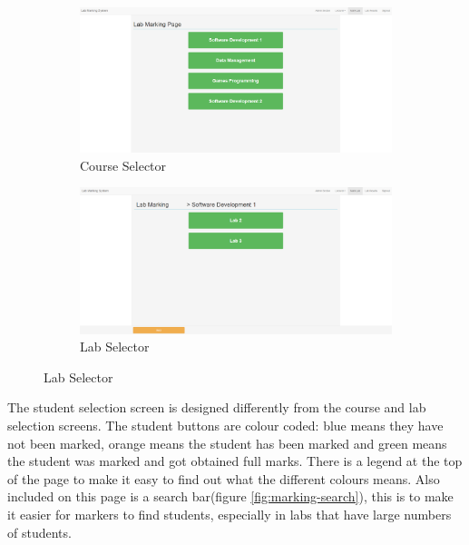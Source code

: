 \documentclass[12pt]{article}  %
\begin{document}
\begin{figure}[H]
\caption{Lab Marking Page}
\centering
\begin{subfigure}[c]{0.45\textwidth}
    \includegraphics[width=1\textwidth]{images/implementation/marking-1-page.png}
    \caption{Course Selector}
    \label{fig:marking-course}
\end{subfigure}
\hfill
\begin{subfigure}[c]{0.45\textwidth}
    \includegraphics[width=1\textwidth]{images/implementation/marking-2-page.png}
    \caption{Lab Selector}
    \label{fig:marking-lab}
\end{subfigure}

\end{figure}

\noindent The student selection screen is designed differently from the course and lab selection screens. The student buttons are colour coded: blue means they have not been marked, orange means the student has been marked and green means the student was marked and got obtained full marks. There is a legend at the top of the page to make it easy to find out what the different colours means. Also included on this page is a search bar(figure \ref{fig:marking-search}), this is to make it easier for markers to find students, especially in labs that have large numbers of students.
\end{document}
